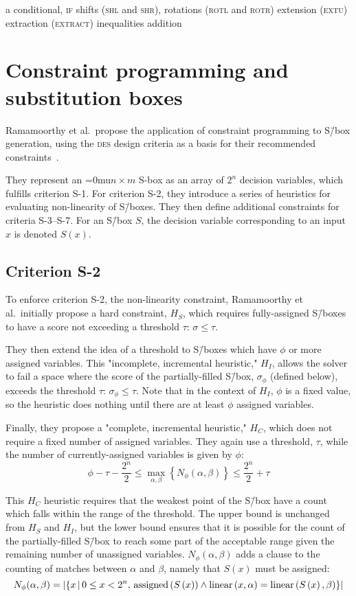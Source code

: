 \documentclass[a4paper,10pt,twoside,openright]{book}
\renewcommand{\sc}[1]{\textsc{\lowercase{#1}}}
\newcommand{\set}[1]{\left\{#1\right\}}
\newcommand{\Nphi}{N_\phi(\alpha,\beta)}
\newcommand*\nbym{\begingroup\medmuskip=0mu\relax$n \times m$\endgroup}
\DeclareMathOperator{\lin}{linear}
\DeclareMathOperator{\assigned}{assigned}
\DeclarePairedDelimiter\Cardinality{\lvert}{\rvert}%
\begin{document}
a conditional, \sc{IF}
shifts (\sc{SHL} and \sc{SHR}), rotations (\sc{ROTL} and \sc{ROTR})
extension (\sc{EXTU})
extraction (\sc{EXTRACT})
inequalities
addition
\fi

\section{Constraint programming and substitution boxes}
\label{sec:cpsbox}
Ramamoorthy et al.\ propose the application of constraint programming to S\=/box generation, 
using the \sc{DES} design criteria as a basis for their recommended constraints~\cite{sboxes}.

They represent an \nbym{} S-box as an array of $2^n$ decision variables, which fulfills criterion S-1.
For criterion S-2, they introduce a series of heuristics for evaluating non-linearity of S\=/boxes. 
They then define additional constraints for criteria S-3--S-7. 
For an S\=/box $S$, the decision variable corresponding to an input $x$ is denoted $S(x)$.

\subsection{Criterion S-2}
\label{sec:stwo}
To enforce criterion S-2, the non-linearity constraint,
Ramamoorthy et al.\ initially propose a hard constraint, $H_S$, which requires fully-assigned S\=/boxes to have a score not exceeding a threshold $\tau$: $\sigma \leq \tau$.

They then extend the idea of a threshold to S\=/boxes which have $\phi$ or more assigned variables.
This "incomplete, incremental heuristic," $H_I$, allows the solver to fail a space where the score of the partially-filled S\=/box, $\sigma_\phi$ (defined below), exceeds the threshold $\tau$: $\sigma_\phi \leq \tau$.
Note that in the context of $H_I$, $\phi$ is a fixed value, so the heuristic does nothing until there are at least $\phi$ assigned variables. 

Finally, they propose a "complete, incremental heuristic," $H_C$, which does not require a fixed number of assigned variables. They again use a threshold, $\tau$, while the number of currently-assigned variables is given by $\phi$:
\[\phi - \tau - \frac{2^n}{2} \leq 
 \max_{\alpha,\beta}\left\{\Nphi\right\} \leq 
\frac{2^n}{2} + \tau\]

This $H_C$ heuristic requires that the weakest point of the S\=/box have a count which falls within the range of the threshold. The upper bound is unchanged from $H_S$ and $H_I$, but the lower bound ensures that it is possible for the count of the partially-filled S\=/box to reach some part of the acceptable range given the remaining number of unassigned variables.
$\Nphi$
adds a clause to the counting of matches between $\alpha$ and $\beta$, namely that $S(x)$ must be assigned: \[
    \Nphi
    = 
    \Cardinality{
        \set{x\,\middle|\,
            0\leq x < 2^n,\,\assigned\left(S\left(x\right)\right) \land \lin\left(x,\alpha\right) = \lin\left(S\left(x\right),\beta\right)
        }
    }
\]
\end{document}
